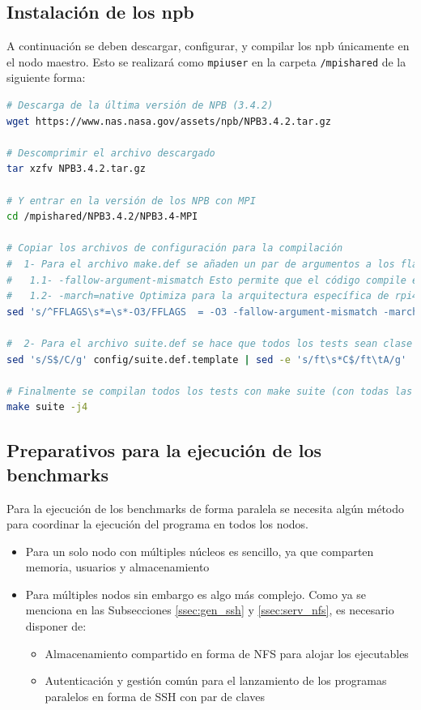 \subsection{Instalación de los \acrshort{npb}}
A continuación se deben descargar, configurar, y compilar los \acrlong{npb} únicamente en el nodo maestro. Esto se realizará como \texttt{mpiuser} en la carpeta \texttt{/mpishared} de la siguiente forma:

\begin{lstlisting}[language=bash]
# Descarga de la última versión de NPB (3.4.2)
wget https://www.nas.nasa.gov/assets/npb/NPB3.4.2.tar.gz

# Descomprimir el archivo descargado
tar xzfv NPB3.4.2.tar.gz

# Y entrar en la versión de los NPB con MPI
cd /mpishared/NPB3.4.2/NPB3.4-MPI

# Copiar los archivos de configuración para la compilación
#  1- Para el archivo make.def se añaden un par de argumentos a los flags de compilación:
#   1.1- -fallow-argument-mismatch Esto permite que el código compile en las últimas versiones de gfortran
#   1.2- -march=native Optimiza para la arquitectura específica de rpi4
sed 's/^FFLAGS\s*=\s*-O3/FFLAGS  = -O3 -fallow-argument-mismatch -march=native/g' config/make.def.template | sed -e 's/^CFLAGS\s*=\s*-O3/CFLAGS  = -O3 -march=native/g' > config/make.def

#  2- Para el archivo suite.def se hace que todos los tests sean clase C menos FT, que por razones de memoria es clase A, y MG clase B, por los mismos motivos.
sed 's/S$/C/g' config/suite.def.template | sed -e 's/ft\s*C$/ft\tA/g' | sed -e 's/mg\s*C$/mg\tB/g' > config/suite.def

# Finalmente se compilan todos los tests con make suite (con todas las CPU en paralelo) $ TODO REMOVE CLOSING DOLLAR
make suite -j4
\end{lstlisting}

\subsection{Preparativos para la ejecución de los benchmarks}
Para la ejecución de los benchmarks de forma paralela se necesita algún método para coordinar la ejecución del programa en todos los nodos.

\begin{itemize}
    \item Para un solo nodo con múltiples núcleos es sencillo, ya que comparten memoria, usuarios y almacenamiento
    \item Para múltiples nodos sin embargo es algo más complejo. Como ya se menciona en las Subsecciones \ref{ssec:gen_ssh} y \ref{ssec:serv_nfs}, es necesario disponer de:
    \begin{itemize}
        \item Almacenamiento compartido en forma de NFS para alojar los ejecutables
        \item Autenticación y gestión común para el lanzamiento de los programas paralelos en forma de SSH con par de claves
    \end{itemize}
\end{itemize}

